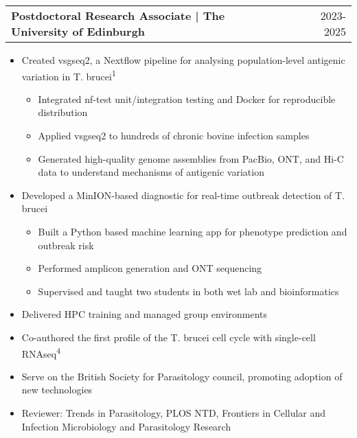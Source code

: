\documentclass[a4paper,11pt]{article}
\makeatletter
\newenvironment{joblong}[2]{
  \begin{tabularx}{\linewidth}{@{}l X r@{}}
  \textbf{#1} & & #2 \\[2pt]
  \end{tabularx}
  \begin{itemize}[leftmargin=1.2em, itemsep=3pt, label=-]
}{
  \end{itemize}
}
\makeatother
\begin{document}
\begin{joblong}{Postdoctoral Research Associate | The University of Edinburgh}{2023-2025}
\item Created vsgseq2, a Nextflow pipeline for analysing population-level antigenic variation in T. brucei\textsuperscript{1}
    \begin{itemize}[leftmargin=2em, itemsep=2pt, label=$\circ$]
        \item Integrated nf-test unit/integration testing and Docker for reproducible distribution
        \item Applied vsgseq2 to hundreds of chronic bovine infection samples
        \item Generated high-quality genome assemblies from PacBio, ONT, and Hi-C data to understand mechanisms of antigenic variation
    \end{itemize}
\item Developed a MinION-based diagnostic for real-time outbreak detection of T. brucei
    \begin{itemize}[leftmargin=2em, itemsep=2pt, label=$\circ$]
        \item Built a Python based machine learning app for phenotype prediction and outbreak risk
        \item Performed amplicon generation and ONT sequencing
        \item Supervised and taught two students in both wet lab and bioinformatics
    \end{itemize}
\item Delivered HPC training and managed group environments
\item Co-authored the first profile of the T. brucei cell cycle with single-cell RNAseq\textsuperscript{4}
\item Serve on the British Society for Parasitology council, promoting adoption of new technologies
\item Reviewer: Trends in Parasitology, PLOS NTD, Frontiers in Cellular and Infection Microbiology and Parasitology Research
\end{joblong}
\end{document}

